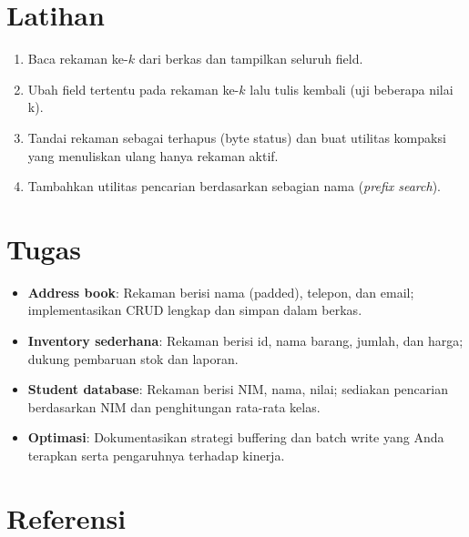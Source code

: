 \section{Latihan}
\begin{enumerate}
  \item Baca rekaman ke-\(k\) dari berkas dan tampilkan seluruh field.
  \item Ubah field tertentu pada rekaman ke-\(k\) lalu tulis kembali (uji beberapa nilai k).
  \item Tandai rekaman sebagai terhapus (byte status) dan buat utilitas kompaksi yang menuliskan ulang hanya rekaman aktif.
  \item Tambahkan utilitas pencarian berdasarkan sebagian nama (\textit{prefix search}).
\end{enumerate}

\section{Tugas}
\begin{itemize}
  \item \textbf{Address book}: Rekaman berisi nama (padded), telepon, dan email; implementasikan CRUD lengkap dan simpan dalam berkas.
  \item \textbf{Inventory sederhana}: Rekaman berisi id, nama barang, jumlah, dan harga; dukung pembaruan stok dan laporan.
  \item \textbf{Student database}: Rekaman berisi NIM, nama, nilai; sediakan pencarian berdasarkan NIM dan penghitungan rata-rata kelas.
  \item \textbf{Optimasi}: Dokumentasikan strategi buffering dan batch write yang Anda terapkan serta pengaruhnya terhadap kinerja.
\end{itemize}

\section{Referensi}
